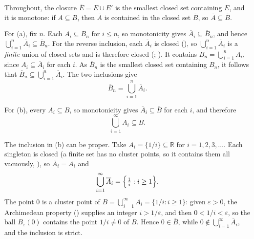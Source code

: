 \documentclass[main.tex]{subfiles}
\begin{document}
\begin{Solution}
Throughout, the closure $\overline{E}=E\cup E'$ is the smallest closed set containing $E$, and it is
monotone: if $A\subseteq B$, then $\overline A$ is contained in the closed set $\overline B$, so
$\overline A\subseteq\overline B$.

For (a), fix $n$. Each $A_{i}\subseteq B_{n}$ for $i\le n$, so monotonicity gives
$\overline{A}_{i}\subseteq\overline{B}_{n}$, and hence
$\bigcup_{i=1}^{n}\overline{A}_{i}\subseteq\overline{B}_{n}$. For the reverse inclusion, each
$\overline{A}_{i}$ is closed (), so $\bigcup_{i=1}^{n}\overline{A}_{i}$ is a \emph{finite}
union of closed sets and is therefore closed (; ). It contains $B_{n}=\bigcup_{i=1}^{n}A_{i}$, since $A_{i}\subseteq\overline{A}_{i}$
for each $i$. As $\overline{B}_{n}$ is the smallest closed set containing $B_{n}$, it follows that
$\overline{B}_{n}\subseteq\bigcup_{i=1}^{n}\overline{A}_{i}$. The two inclusions give
\[
\overline{B}_{n}=\bigcup_{i=1}^{n}\overline{A}_{i}.
\]

For (b), every $A_{i}\subseteq B$, so monotonicity gives $\overline{A}_{i}\subseteq\overline{B}$ for each
$i$, and therefore
\[
\bigcup_{i=1}^{\infty}\overline{A}_{i}\subseteq\overline{B}.
\]

The inclusion in (b) can be proper. Take $A_{i}=\{1/i\}\subseteq\mathbb{R}$ for $i=1,2,3,\dots$. Each
singleton is closed (a finite set has no cluster points, so it contains them all vacuously, ),
so $\overline{A}_{i}=A_{i}$ and
\[
\bigcup_{i=1}^{\infty}\overline{A}_{i}=\Bigl\{\tfrac{1}{i}:i\ge 1\Bigr\}.
\]
The point $0$ is a cluster point of $B=\bigcup_{i=1}^{\infty}A_{i}=\{1/i:i\ge 1\}$: given $\varepsilon>0$,
the Archimedean property () supplies an integer $i>1/\varepsilon$,
and then $0<1/i<\varepsilon$, so the ball $B_{\varepsilon}(0)$ contains the point $1/i\neq 0$ of $B$. Hence
$0\in\overline{B}$, while $0\notin\bigcup_{i=1}^{\infty}\overline{A}_{i}$, and the inclusion is strict.
\end{Solution}
\end{document}
